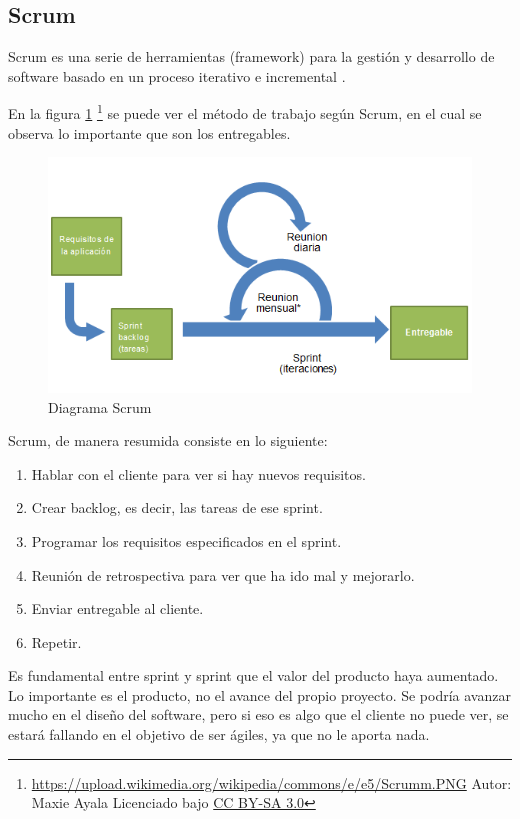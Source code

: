 \subsection{Scrum}
Scrum es una serie de herramientas (framework) para la gesti\'on y desarrollo de software basado en un proceso iterativo e incremental 
\cite{Scrum:WhatIsIt}.

En la figura \ref{fig:Scrum} \footnote{\url{https://upload.wikimedia.org/wikipedia/commons/e/e5/Scrumm.PNG} Autor: Maxie Ayala 
    Licenciado bajo \hyperlink{creativecommons.org/licenses/by-sa/3.0/}{CC BY-SA 3.0}} 
se puede ver el método de trabajo seg\'un Scrum, en el cual se observa lo importante que son los entregables.

\begin{figure}[h]
	\includegraphics[width=0.7\linewidth]{./Figures/Scrumm.PNG}
	\caption[Proceso iterativo Scrum]{Diagrama Scrum}
	\label{fig:Scrum}
\end{figure}

Scrum, de manera resumida consiste en lo siguiente:
\begin{enumerate}
	\item Hablar con el cliente para ver si hay nuevos requisitos.
	\item Crear backlog, es decir, las tareas de ese sprint.
	\item Programar los requisitos especificados en el sprint.
	\item Reunión de retrospectiva para ver que ha ido mal y mejorarlo.
	\item Enviar entregable al cliente.
	\item Repetir.
\end{enumerate}

Es fundamental entre sprint y sprint que el valor del producto haya aumentado. Lo importante es el producto, no el 
avance del propio proyecto. Se podr\'ia avanzar mucho en el dise\~no del software, pero si eso es algo que el cliente no 
puede ver, se estar\'a fallando en el objetivo de ser \'agiles, ya que no le aporta nada.

